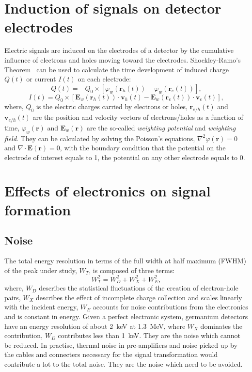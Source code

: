 \section{Induction of signals on detector electrodes}
\label{sec:det:lamo}
Electric signals are induced on the electrodes of a detector by the cumulative influence of electrons and holes moving toward the electrodes. Shockley-Ramo's Theorem~\cite{Gat82, Rad88, He00} can be used to calculate the time development of induced charge $Q(t)$ or current $I(t)$ on each electrode:
\begin{equation} 
  \label{eq:det:ramoq}
  Q(t) = -Q_{0} \times [\varphi_{w}(\mathbf{r}_{h}(t)) - \varphi_{w}(\mathbf{r}_{e}(t))],
\end{equation}
\begin{equation} 
  \label{eq:det:ramoi}
  I(t) = Q_{0} \times [\mathbf{E}_{w}(\mathbf{r}_{h}(t)) \cdot \mathbf{v}_{h}(t) - \mathbf{E}_{w}(\mathbf{r}_{e}(t)) \cdot \mathbf{v}_{e}(t)],
\end{equation}
where, $Q_{0}$ is the electric charges carried by electrons or holes, $\mathbf{r}_{e/h}(t)$ and $\mathbf{v}_{e/h}(t)$ are the position and velocity vectors of electrons/holes as a function of time, $\varphi_{w}(\mathbf{r})$ and $\mathbf{E}_{w}(\mathbf{r})$ are the so-called \emph{weighting potential} and \emph{weighting field}. They can be calculated by solving the Poisson's equations, $\nabla^{2} \varphi(\mathbf{r}) = 0$ and $\nabla \cdot \mathbf{E}(\mathbf{r}) = 0$, with the boundary condition that the potential on the electrode of interest equals to 1, the potential on any other electrode equals to 0.

\section{Effects of electronics on signal formation}
\label{sec:det:elec}

\subsection{Noise}
\label{sec:det:noise}
The total energy resolution in terms of the full width at half maximum
(FWHM) of the peak under study, $W_{T}$, is composed of three terms:
\begin{equation}
W_{T}^{2} = W_{D}^{2} + W_{X}^{2} + W_{E}^{2},
\end{equation}
where, $W_{D}$ describes the statistical fluctuations of the creation of electron-hole pairs, $W_{X}$ describes the effect of incomplete charge collection and scales linearly with the incident energy, $W_{E}$ accounts for noise contributions from the electronics and is constant in energy. Given a perfect electronic system, germanium detectors have an energy resolution of about 2~keV at 1.3~MeV, where $W_{X}$ dominates the contribution, $W_{D}$ contributes less than 1~keV. They are the noise which cannot be reduced. In practise, thermal noise in pre-amplifiers and noise picked up by the cables and connecters necessary for the signal transformation would contribute a lot to the total noise. They are the noise which need to be avoided.

